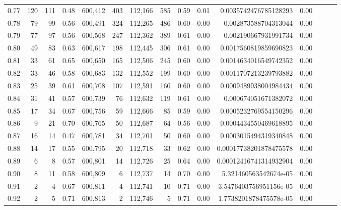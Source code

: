 \begin{tabular}{rrrrrrrrrrrrrrr}
0.77 &     120 &    111 &  0.48 &  600,412 &      403 &  112,166 &      585 &  0.59 &  0.01 &   0.0035742476785128293 &      0.00 \\
0.78 &      79 &     99 &  0.56 &  600,491 &      324 &  112,265 &      486 &  0.60 &  0.00 &    0.002873588704313044 &      0.00 \\
0.79 &      77 &     97 &  0.56 &  600,568 &      247 &  112,362 &      389 &  0.61 &  0.00 &    0.002190667931991734 &      0.00 \\
0.80 &      49 &     83 &  0.63 &  600,617 &      198 &  112,445 &      306 &  0.61 &  0.00 &   0.0017560819859690823 &      0.00 \\
0.81 &      33 &     61 &  0.65 &  600,650 &      165 &  112,506 &      245 &  0.60 &  0.00 &   0.0014634016549742352 &      0.00 \\
0.82 &      33 &     46 &  0.58 &  600,683 &      132 &  112,552 &      199 &  0.60 &  0.00 &   0.0011707213239793882 &      0.00 \\
0.83 &      25 &     39 &  0.61 &  600,708 &      107 &  112,591 &      160 &  0.60 &  0.00 &   0.0009489938004984434 &      0.00 \\
0.84 &      31 &     41 &  0.57 &  600,739 &       76 &  112,632 &      119 &  0.61 &  0.00 &    0.000674051671382072 &      0.00 \\
0.85 &      17 &     34 &  0.67 &  600,756 &       59 &  112,666 &       85 &  0.59 &  0.00 &   0.0005232769554150296 &      0.00 \\
0.86 &       9 &     21 &  0.70 &  600,765 &       50 &  112,687 &       64 &  0.56 &  0.00 &   0.0004434550469618895 &      0.00 \\
0.87 &      16 &     14 &  0.47 &  600,781 &       34 &  112,701 &       50 &  0.60 &  0.00 &   0.0003015494319340848 &      0.00 \\
0.88 &      14 &     17 &  0.55 &  600,795 &       20 &  112,718 &       33 &  0.62 &  0.00 &  0.00017738201878475578 &      0.00 \\
0.89 &       6 &      8 &  0.57 &  600,801 &       14 &  112,726 &       25 &  0.64 &  0.00 &  0.00012416741314932904 &      0.00 \\
0.90 &       8 &     11 &  0.58 &  600,809 &        6 &  112,737 &       14 &  0.70 &  0.00 &   5.321460563542674e-05 &      0.00 \\
0.91 &       2 &      4 &  0.67 &  600,811 &        4 &  112,741 &       10 &  0.71 &  0.00 &  3.5476403756951156e-05 &      0.00 \\
0.92 &       2 &      5 &  0.71 &  600,813 &        2 &  112,746 &        5 &  0.71 &  0.00 &  1.7738201878475578e-05 &      0.00 \\

\end{tabular}
